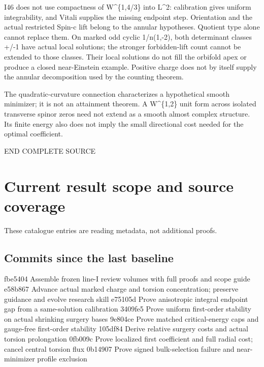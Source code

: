 \documentclass[
  10pt,
]{article}
\begin{document}
I46 does not use compactness of W\^{}\{1,4/3\} into L\^{}2: calibration
gives uniform integrability, and Vitali supplies the missing endpoint
step. Orientation and the actual restricted Spin-c lift belong to the
annular hypotheses. Quotient type alone cannot replace them. On marked
odd cyclic 1/n(1,-2), both determinant classes +/-1 have actual local
solutions; the stronger forbidden-lift count cannot be extended to those
classes. Their local solutions do not fill the orbifold apex or produce
a closed near-Einstein example. Positive charge does not by itself
supply the annular decomposition used by the counting theorem.

The quadratic-curvature connection characterizes a hypothetical smooth
minimizer; it is not an attainment theorem. A W\^{}\{1,2\} unit form
across isolated transverse spinor zeros need not extend as a smooth
almost complex structure. Its finite energy also does not imply the
small directional cost needed for the optimal coefficient.

END COMPLETE SOURCE

\hypertarget{current-result-scope-and-source-coverage}{%
\section{Current result scope and source
coverage}\label{current-result-scope-and-source-coverage}}

These catalogue entries are reading metadata, not additional proofs.

\hypertarget{commits-since-the-last-baseline}{%
\subsection{Commits since the last
baseline}\label{commits-since-the-last-baseline}}

fbe5404 Assemble frozen line-I review volumes with full proofs and scope
guide e58b867 Advance actual marked charge and torsion concentration;
preserve guidance and evolve research skill e75105d Prove anisotropic
integral endpoint gap from a same-solution calibration 3409fe5 Prove
uniform first-order stability on actual shrinking surgery bases 9e804ce
Prove matched critical-energy caps and gauge-free first-order stability
105df84 Derive relative surgery costs and actual torsion prolongation
0fb009c Prove localized first coefficient and full radial cost; cancel
central torsion flux 0b14907 Prove signed bulk-selection failure and
near-minimizer profile exclusion
\end{document}
